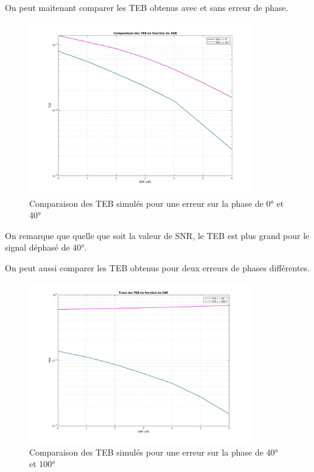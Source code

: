 \documentclass[11pt,a4paper]{report}
\begin{document}

\vspace{0.3cm}

On peut maitenant comparer les TEB obtenus avec et sans erreur de phase.


\begin{figure}[H]
    \centering
    \includegraphics[height=7.5cm]{Screenshots/2_4_b.jpg}
    \caption{Comparaison des TEB simulés pour une erreur sur la phase de 0° et 40°}
    \label{fig:un_label} 
\end{figure}

On remarque que quelle que soit la valeur de SNR, le TEB est plus grand pour le signal déphasé de 40°.


\newpage

\vspace{0.3cm}

On peut aussi comparer les TEB obtenus pour deux erreurs de phases différentes.

\begin{figure}[H]
    \centering
    \includegraphics[height=7cm]{Screenshots/2_4_c.jpg}
    \caption{Comparaison des TEB simulés pour une erreur sur la phase de 40° et 100°}
    \label{fig:un_label} 
\end{figure}
\end{document}

